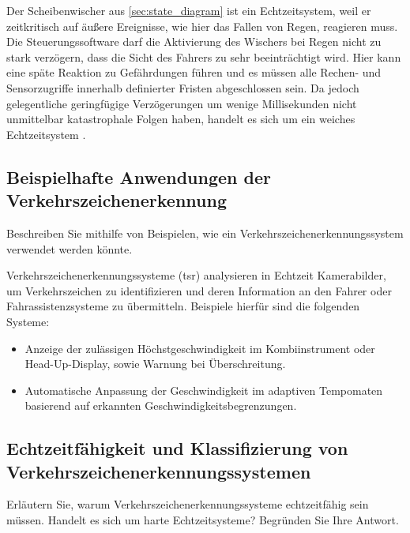 \documentclass[
%
ngerman %
%
numeric %
]{wbh-assignment}
\begin{document}

Der Scheibenwischer aus \autoref{sec:state_diagram} ist ein Echtzeitsystem, weil er zeitkritisch auf äußere Ereignisse, wie hier das Fallen von Regen, reagieren muss.
Die Steuerungssoftware darf die Aktivierung des Wischers bei Regen nicht zu stark verzögern, dass die Sicht des Fahrers zu sehr beeinträchtigt wird.
Hier kann eine späte Reaktion zu Gefährdungen führen und es müssen alle Rechen- und Sensorzugriffe innerhalb definierter Fristen abgeschlossen sein.
Da jedoch gelegentliche geringfügige Verzögerungen um wenige Millisekunden nicht unmittelbar katastrophale Folgen haben, handelt es sich um ein weiches Echtzeitsystem \cite{HowAchieveDeterministic}.

\subsection{Beispielhafte Anwendungen der Verkehrszeichenerkennung}
\begin{aufgabenstellung}
Beschreiben Sie mithilfe von Beispielen, wie ein Verkehrszeichenerkennungssystem verwendet werden könnte.
\end{aufgabenstellung}


Verkehrszeichenerkennungssysteme (\ac{tsr}) analysieren in Echtzeit Kamerabilder, um Verkehrszeichen zu identifizieren und deren Information an den Fahrer oder Fahrassistenzsysteme zu übermitteln.
Beispiele hierfür sind die folgenden Systeme:
\begin{itemize}
  \item Anzeige der zulässigen Höchstgeschwindigkeit im Kombiinstrument oder Head-Up-Display, sowie Warnung bei Überschreitung.
  \item Automatische Anpassung der Geschwindigkeit im adaptiven Tempomaten basierend auf erkannten Geschwindigkeitsbegrenzungen.
\end{itemize}

\subsection{Echtzeitfähigkeit und Klassifizierung von Verkehrszeichenerkennungssystemen}
\begin{aufgabenstellung}
Erläutern Sie, warum Verkehrszeichenerkennungssysteme echtzeitfähig sein müssen. Handelt es sich um harte Echtzeitsysteme? Begründen Sie Ihre Antwort.
\end{aufgabenstellung}
\end{document}
